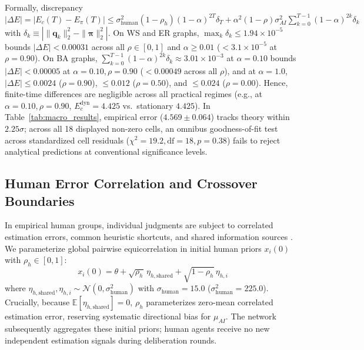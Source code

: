 \documentclass
[letterpaper]{article}
\begin{document}
Formally, discrepancy $|\Delta E| = |E_c(T) - E_\pi(T)| \le \sigma_{\text{human}}^2 (1 - \rho_h)(1 - \alpha)^{2T} \delta_T + \alpha^2 (1 - \rho)\sigma_{AI}^2 \sum_{k=0}^{T-1}(1 - \alpha)^{2k} \delta_k$ with $\delta_k \equiv |\|\mathbf{q}_k\|_2^2 - \|\boldsymbol{\pi}\|_2^2|$. On WS and ER graphs, $\max_k \delta_k \le 1.94 \times 10^{-5}$ bounds $|\Delta E| < 0.00031$ across all $\rho \in [0, 1]$ and $\alpha \ge 0.01$ ($< 3.1 \times 10^{-5}$ at $\rho = 0.90$). On BA graphs, $\sum_{k=0}^{T-1}(1-\alpha)^{2k}\delta_k \approx 3.01 \times 10^{-3}$ at $\alpha = 0.10$ bounds $|\Delta E| < 0.00005$ at $\alpha = 0.10, \rho = 0.90$ ($< 0.00049$ across all $\rho$), and at $\alpha = 1.0$, $|\Delta E| \le 0.0024$ ($\rho = 0.90$), $\le 0.012$ ($\rho = 0.50$), and $\le 0.024$ ($\rho = 0.00$). Hence, finite-time differences are negligible across all practical regimes (e.g., at $\alpha = 0.10, \rho = 0.90$, $E_c^{\text{dyn}} = 4.425$ vs.\ stationary $4.425$). In Table~\ref{tab:macro_results}, empirical error ($4.569 \pm 0.064$) tracks theory within $2.25\sigma$; across all 18 displayed non-zero cells, an omnibus goodness-of-fit test across standardized cell residuals ($\chi^2 = 19.2, \text{df} = 18, p = 0.38$) fails to reject analytical predictions at conventional significance levels.

\subsection{Human Error Correlation and Crossover Boundaries}
\label{sec:human_correlation_crossover}
In empirical human groups, individual judgments are subject to correlated estimation errors, common heuristic shortcuts, and shared information sources \citep{lorenz2011social, soll2009strategies, becker2017network}. We parameterize global pairwise equicorrelation in initial human priors $x_i(0)$ with $\rho_h \in [0, 1]$:
\begin{equation}
x_i(0) = \theta + \sqrt{\rho_h} \, \eta_{h, \text{shared}} + \sqrt{1 - \rho_h} \, \eta_{h, i}
\end{equation}
where $\eta_{h, \text{shared}}, \eta_{h, i} \sim \mathcal{N}(0, \sigma_{\text{human}}^2)$ with $\sigma_{\text{human}} = 15.0$ ($\sigma_{\text{human}}^2 = 225.0$). Crucially, because $\mathbb{E}[\eta_{h, \text{shared}}] = 0$, $\rho_h$ parameterizes zero-mean correlated estimation error, reserving systematic directional bias for $\mu_{AI}$. The network subsequently aggregates these initial priors; human agents receive no new independent estimation signals during deliberation rounds.
\end{document}
